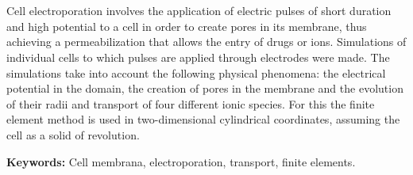 \chapter*{\runtitle}

\noindent 

Cell electroporation involves the application of electric pulses of short duration and high potential to a cell in order to create pores in its membrane, thus achieving a permeabilization that allows the entry of drugs or ions. Simulations of individual cells to which pulses are applied through electrodes were made. The simulations take into account the following physical phenomena: the electrical potential in the domain, the creation of pores in the membrane and the evolution of their radii and transport of four different ionic species. For this the finite element method is used in two-dimensional cylindrical coordinates, assuming the cell as a solid of revolution.

\bigskip

\noindent\textbf{Keywords:} Cell membrana, electroporation, transport, finite elements.